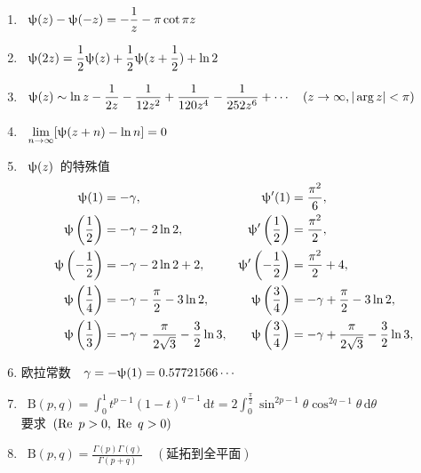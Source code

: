 \documentclass[11pt,a4paper]{article}
\newcommand\diff{\,\mathrm{d}}
\renewcommand{\m}[1]{~$\displaystyle#1$~}
\newcommand\re{\mathop{\rm Re~}}
\begin{document}
\begin{enumerate}
      \item \m{\psif(z) - \psif(-z) = -\frac 1z -\pi\cot\pi z}
      \item \m{\psif(2z) = \frac 12\psif(z) + \frac 12\psif(z+\frac 12) + \ln 2}
      \item \m{\psif(z) \sim \ln z - \frac 1{2z} - \frac 1{12z^2} + \frac 1{120z^4} - \frac 1{252z^6} + \cdots\quad(z\to\infty,|\arg z|<\pi)}
      \item \m{\lim_{n\to\infty}[\psif(z+n)-\ln n] = 0}
      \item \m{\psif(z)}的特殊值
        \begin{align*}
          \mathrm{\uppsi}(1) &=-\gamma, &\mathrm{\uppsi}'(1) &= \frac {\pi^2}6,\\
          \mathrm{\uppsi}\left(\frac 12\right) &= -\gamma - 2\ln 2, &\mathrm{\uppsi}'\left(\frac 12\right) &= \frac {\pi^2}2,\\
          \mathrm{\uppsi}\left(-\frac 12\right) &= -\gamma - 2\ln 2 + 2 , &\mathrm{\uppsi}'\left(-\frac 12\right) &= \frac {\pi^2}2 +4,\\
          \mathrm{\uppsi}\left(\frac 14\right) &= -\gamma - \frac \pi 2 - 3\ln 2, &\mathrm{\uppsi}\left(\frac 34\right) &= -\gamma + \frac \pi 2 - 3\ln 2,\\
          \mathrm{\uppsi}\left(\frac 13\right) &= -\gamma - \frac \pi {2\sqrt{3}} - \frac 32\ln 3, &\mathrm{\uppsi}\left(\frac 34\right) &= -\gamma + \frac \pi {2\sqrt{3}} - \frac 32\ln 3,
        \end{align*}
      \item 欧拉常数~\m{\gamma = -\psif(1) = 0.57721566\cdots}
      \newcommand\Beta{\ensuremath{\mathrm{B}}}
      \item \m{\Beta(p,q) = \int_0^1 t^{p-1}(1-t)^{q-1}\diff t = 2\int_0^{\frac \pi 2}\sin^{2p-1}\theta\cos^{2q-1}\theta\diff \theta}\\
        要求\m{(\re p>0,~\re q>0)}
      \item \m{\Beta (p,q) = \frac {\Gamma(p)\Gamma(q)}{\Gamma(p+q)}\quad(\mbox{延拓到全平面})}
    \end{enumerate}
\end{document}
